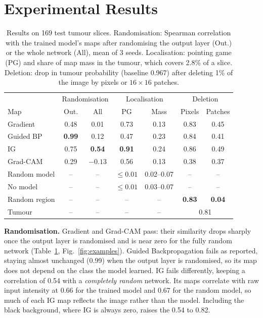 \documentclass[conference]{IEEEtran}
\begin{document}
\section{Experimental Results}
\label{sec:results}
\begin{table}[t]
\centering
\caption{Results on 169 test tumour slices. Randomisation: Spearman correlation with the trained model's maps after randomising the output layer (Out.) or the whole network (All), mean of 3 seeds. Localisation: pointing game (PG) and share of map mass in the tumour, which covers 2.8\% of a slice. Deletion: drop in tumour probability (baseline 0.967) after deleting 1\% of the image by pixels or $16\times16$ patches.}
\label{tab:results}
\setlength{\tabcolsep}{2.5pt}
\begin{tabular}{lcccccc}
\hline
 & \multicolumn{2}{c}{Randomisation} & \multicolumn{2}{c}{Localisation} & \multicolumn{2}{c}{Deletion} \\
Map & Out. & All & PG & Mass & Pixels & Patches \\
\hline
Gradient & 0.48 & 0.01 & 0.73 & 0.13 & 0.83 & 0.45 \\
Guided BP & \textbf{0.99} & 0.12 & 0.47 & 0.23 & 0.84 & 0.41 \\
IG & 0.75 & \textbf{0.54} & \textbf{0.91} & 0.24 & 0.86 & 0.49 \\
Grad-CAM & 0.29 & $-0.13$ & 0.56 & 0.13 & 0.38 & 0.37 \\
\hline
Random model & -- & -- & $\leq 0.01$ & 0.02--0.07 & -- & -- \\
No model & -- & -- & $\leq 0.01$ & 0.03--0.07 & -- & -- \\
Random region & -- & -- & -- & -- & \textbf{0.83} & \textbf{0.04} \\
Tumour & -- & -- & -- & -- & \multicolumn{2}{c}{0.81} \\
\hline
\end{tabular}
\end{table}

\textbf{Randomisation.} Gradient and Grad-CAM pass: their similarity drops sharply once the output layer is randomised and is near zero for the fully random network (Table~\ref{tab:results}, Fig.~\ref{fig:examples}). Guided Backpropagation fails as \citet{adebayo2018sanity} reported, staying almost unchanged (0.99) when the output layer is randomised, so its map does not depend on the class the model learned. IG fails differently, keeping a correlation of 0.54 with a \emph{completely random} network. Its maps correlate with raw input intensity at 0.66 for the trained model and 0.67 for the random model, so much of each IG map reflects the image rather than the model. Including the black background, where IG is always zero, raises the 0.54 to 0.82.
\end{document}
